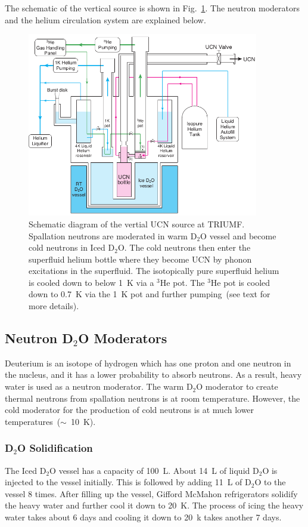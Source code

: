 The schematic of the vertical source is shown in
Fig.~\ref{fig:source}.  The neutron moderators and the helium
circulation system are explained below.


\begin{figure}[h!]
  \centering
  \includegraphics[width=0.9\textwidth]{vertical_source.png}
  \caption{Schematic diagram of the vertial UCN source at
    TRIUMF. Spallation neutrons are moderated in warm D$_2$O vessel
    and become cold neutrons in Iced D$_2$O. The cold neutrons then
    enter the superfluid helium bottle where they become UCN by phonon
    excitations in the superfluid. The isotopically pure superfluid
    helium is cooled down to below 1~K via a $^3$He pot. The $^3$He
    pot is cooled down to 0.7~K via the 1~K pot and further
    pumping~(see text for more details). }
  \label{fig:source}
\end{figure}


\subsection{Neutron D$_2$O Moderators}
Deuterium is an isotope of hydrogen which has one proton and one
neutron in the nucleus, and it has a lower probability to absorb
neutrons. As a result, heavy water is used as a neutron moderator. The
warm D$_2$O moderator to create thermal neutrons from spallation
neutrons is at room temperature. However, the cold moderator for the
production of cold neutrons is at much lower
temperatures~($\sim$~10~K).

\subsubsection{D$_2$O Solidification}
The Iced D$_2$O vessel has a capacity of 100~L. About 14~L of liquid
D$_2$O is injected to the vessel initially. This is followed by adding 11~L of
D$_2$O to the vessel 8 times.  After filling up the vessel,
Gifford McMahon refrigerators solidify the heavy water and further
cool it down to 20~K. The process of icing the heavy water takes about
6 days and cooling it down to 20~k takes another 7 days.


